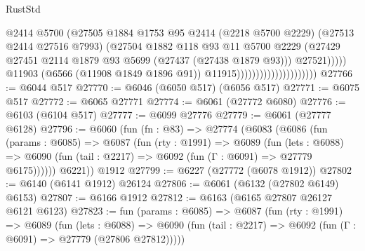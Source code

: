 \begin{lexlean}{RustStd}
\begin{coremodule}
{\begin{coremodule}
{{{{{{{{{{{{{{{{{{{{{{{{{{                                                    @2414
                                                    @5700
                                                    (@27505
                                                      @1884
                                                      @1753
                                                      @95
                                                      @2414
                                                      (@2218 @5700 @2229)
                                                      (@27513 @2414 @27516 @7993)
                                                      (@27504
                                                        @1882
                                                        @118
                                                        @93
                                                        @11
                                                        @5700
                                                        @2229
                                                        (@27429
                                                          @27451
                                                          @2114
                                                          @1879
                                                          @93
                                                          @5699
                                                          (@27437 (@27438 @1879 @93)))
                                                        @27521)))))
                                              @11903
                                              (@6566 (@11908 @1849 @1896 @91))
                                              @11915)))))))))))))))))))))
@27766 := @6044 @517
@27770 := @6046 (@6050 @517) (@6056 @517)
@27771 := @6075 @517
@27772 := @6065 @27771
@27774 := @6061 (@27772 @6080)
@27776 := @6103 (@6104 @517)
@27777 := @6099 @27776
@27779 := @6061 (@27777 @6128)
@27796 := @6060
    (fun (fn : @83) =>
    @27774
      (@6083
        (@6086
          (fun (params : @6085) =>
          @6087
            (fun (rty : @1991) =>
            @6089
              (fun (lets : @6088) =>
              @6090 (fun (tail : @2217) => @6092 (fun (Γ : @6091) => @27779 @6175))))))
        @6221))
    @1912
@27799 := @6227 (@27772 (@6078 @1912))
@27802 := @6140 (@6141 @1912) @26124
@27806 := @6061 (@6132 (@27802 @6149) @6153)
@27807 := @6166 @1912
@27812 := @6163 (@6165 @27807 @26127 @6121 @6123)
@27823 := fun (params : @6085) =>
  @6087
    (fun (rty : @1991) =>
    @6089
      (fun (lets : @6088) =>
      @6090 (fun (tail : @2217) => @6092 (fun (Γ : @6091) => @27779 (@27806 @27812)))))
}}}}}}}}}}}}}}}}}}}}}}}}}}
\end{coremodule}}
\end{coremodule}
\end{lexlean}
